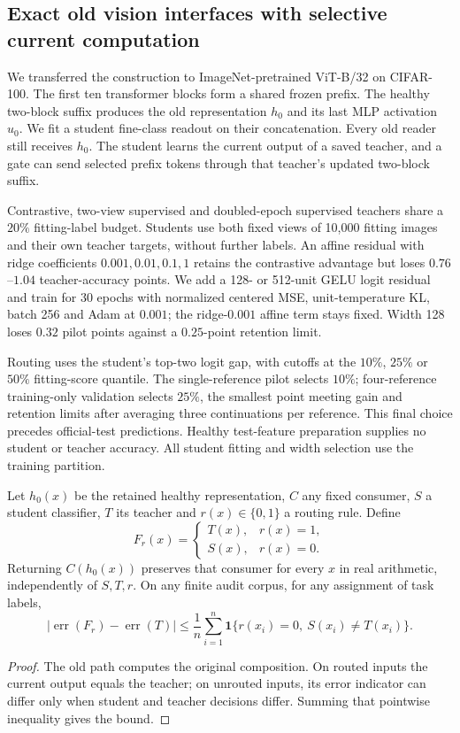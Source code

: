 \subsection{Exact old vision interfaces with selective current computation}
\label{app:vit_deployment}

We transferred the construction to ImageNet-pretrained ViT-B/32 on
CIFAR-100. The first ten transformer blocks form a shared frozen
prefix. The healthy two-block suffix produces the old representation
$h_0$ and its last MLP activation $u_0$. We fit a student fine-class
readout on their concatenation. Every old reader still receives
$h_0$. The student learns the current output of a saved teacher, and
a gate can send selected prefix tokens through that teacher's
updated two-block suffix.

Contrastive, two-view supervised and doubled-epoch supervised teachers
share a $20\%$ fitting-label budget. Students use both fixed views of
10,000 fitting images and their own teacher targets, without further labels.
An affine residual with ridge coefficients $0.001,0.01,0.1,1$ retains the
contrastive advantage but loses $0.76$--$1.04$ teacher-accuracy points.
We add a 128- or 512-unit GELU logit residual and train for 30 epochs
with normalized centered MSE, unit-temperature KL, batch 256 and
Adam at $0.001$; the ridge-$0.001$ affine term stays fixed.
Width 128 loses $0.32$ pilot points against a $0.25$-point retention limit.

Routing uses the student's top-two logit gap, with cutoffs at the $10\%$,
$25\%$ or $50\%$ fitting-score quantile. The single-reference pilot selects
$10\%$; four-reference training-only validation selects $25\%$, the smallest
point meeting gain and retention limits after averaging three continuations
per reference. This final choice precedes official-test predictions.
Healthy test-feature preparation supplies no student or teacher accuracy.
All student fitting and width selection use the training partition.

\begin{proposition}
\label{prop:selective_current}
Let $h_0(x)$ be the retained healthy representation, $C$ any fixed
consumer, $S$ a student classifier, $T$ its teacher and $r(x)\in\{0,1\}$
a routing rule. Define
\[
 F_r(x)=
 \begin{cases}
 T(x),&r(x)=1,\\
 S(x),&r(x)=0.
 \end{cases}
\]
Returning $C(h_0(x))$ preserves that consumer for every $x$ in real
arithmetic, independently of $S,T,r$. On any finite audit corpus,
for any assignment of task labels,
\[
 \left|\operatorname{err}(F_r)-\operatorname{err}(T)\right|
 \leq \frac{1}{n}\sum_{i=1}^{n}
     \mathbf 1\{r(x_i)=0,\ S(x_i)\ne T(x_i)\}.
\]
\end{proposition}
\begin{proof}
The old path computes the original composition. On routed inputs
the current output equals the teacher; on unrouted inputs, its error
indicator can differ only when student and teacher decisions differ.
Summing that pointwise inequality gives the bound.
\end{proof}

